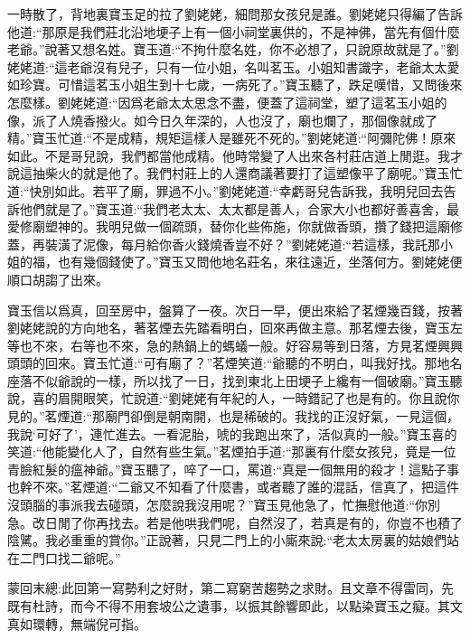 \begin{parag}
    一時散了，背地裏寶玉足的拉了劉姥姥，細問那女孩兒是誰。劉姥姥只得編了告訴他道:“那原是我們莊北沿地埂子上有一個小祠堂裏供的，不是神佛，當先有個什麼老爺。”說著又想名姓。寶玉道:“不拘什麼名姓，你不必想了，只說原故就是了。”劉姥姥道:“這老爺沒有兒子，只有一位小姐，名叫茗玉。小姐知書識字，老爺太太愛如珍寶。可惜這茗玉小姐生到十七歲，一病死了。”寶玉聽了，跌足嘆惜，又問後來怎麼樣。劉姥姥道:“因爲老爺太太思念不盡，便蓋了這祠堂，塑了這茗玉小姐的像，派了人燒香撥火。如今日久年深的，人也沒了，廟也爛了，那個像就成了精。”寶玉忙道:“不是成精，規矩這樣人是雖死不死的。”劉姥姥道:“阿彌陀佛！原來如此。不是哥兒說，我們都當他成精。他時常變了人出來各村莊店道上閒逛。我才說這抽柴火的就是他了。我們村莊上的人還商議著要打了這塑像平了廟呢。”寶玉忙道:“快別如此。若平了廟，罪過不小。”劉姥姥道:“幸虧哥兒告訴我，我明兒回去告訴他們就是了。”寶玉道:“我們老太太、太太都是善人，合家大小也都好善喜舍，最愛修廟塑神的。我明兒做一個疏頭，替你化些佈施，你就做香頭，攢了錢把這廟修蓋，再裝潢了泥像，每月給你香火錢燒香豈不好？”劉姥姥道:“若這樣，我託那小姐的福，也有幾個錢使了。”寶玉又問他地名莊名，來往遠近，坐落何方。劉姥姥便順口胡謅了出來。
\end{parag}


\begin{parag}
    寶玉信以爲真，回至房中，盤算了一夜。次日一早，便出來給了茗煙幾百錢，按著劉姥姥說的方向地名，著茗煙去先踏看明白，回來再做主意。那茗煙去後，寶玉左等也不來，右等也不來，急的熱鍋上的螞蟻一般。好容易等到日落，方見茗煙興興頭頭的回來。寶玉忙道:“可有廟了？”茗煙笑道:“爺聽的不明白，叫我好找。那地名座落不似爺說的一樣，所以找了一日，找到東北上田埂子上纔有一個破廟。”寶玉聽說，喜的眉開眼笑，忙說道:“劉姥姥有年紀的人，一時錯記了也是有的。你且說你見的。”茗煙道:“那廟門卻倒是朝南開，也是稀破的。我找的正沒好氣，一見這個，我說‘可好了’，連忙進去。一看泥胎，唬的我跑出來了，活似真的一般。”寶玉喜的笑道:“他能變化人了，自然有些生氣。”茗煙拍手道:“那裏有什麼女孩兒，竟是一位青臉紅髮的瘟神爺。”寶玉聽了，啐了一口，罵道:“真是一個無用的殺才！這點子事也幹不來。”茗煙道:“二爺又不知看了什麼書，或者聽了誰的混話，信真了，把這件沒頭腦的事派我去碰頭，怎麼說我沒用呢？”寶玉見他急了，忙撫慰他道:“你別急。改日閒了你再找去。若是他哄我們呢，自然沒了，若真是有的，你豈不也積了陰騭。我必重重的賞你。”正說著，只見二門上的小廝來說:“老太太房裏的姑娘們站在二門口找二爺呢。”
\end{parag}


\begin{parag}
    \begin{note}蒙回末總:此回第一寫勢利之好財，第二寫窮苦趨勢之求財。且文章不得雷同，先既有杜詩，而今不得不用套坡公之遺事，以振其餘響即此，以點染寶玉之癡。其文真如環轉，無端倪可指。\end{note}
\end{parag}

